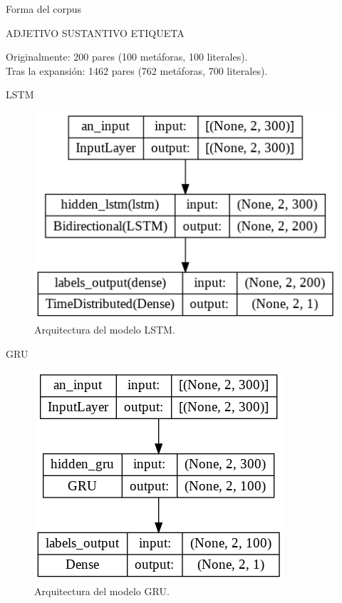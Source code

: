 \documentclass[12pt]{beamer}
\begin{document}
\begin{frame}{Forma del corpus}
\begin{center}
 ADJETIVO SUSTANTIVO ETIQUETA
\end{center}
Originalmente: 200 pares (100 metáforas, 100 literales).\\
Tras la expansión: 1462 pares (762 metáforas, 700 literales).
\end{frame}

\begin{frame}{LSTM}
\begin{figure}[htb]\label{Fig:lstm_mod}
\includegraphics[scale= 0.6]{Graphics/lstm_metaphor_model.png}
\caption{Arquitectura del modelo LSTM.}
\end{figure}
\end{frame}
\begin{frame}{GRU}
\begin{figure}[htb]\label{Fig:gru_mod}
\includegraphics[scale= 0.6]{Graphics/gru_metaphor_model.png}
\caption{Arquitectura del modelo GRU.}
\end{figure}
\end{frame}
\end{document}
